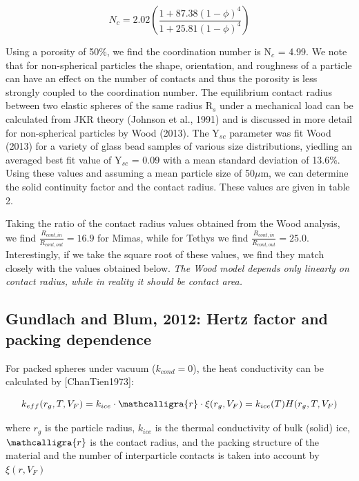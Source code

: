 \documentclass[11pt]{article} %
\newcommand{\vf}{\ensuremath{V_{F}}\xspace}
\newcommand{\sr}{\ensuremath{\mathcalligra{r}} \xspace}
\begin{document}
\begin{itemize}
	\begin{equation}
	N_{c} = 2.02 \left( \frac{1+87.38(1-\phi)^{4}}{1+25.81(1-\phi)^{4}} \right)
	\end{equation}
	
	Using a porosity of 50\%, we find the coordination number is N$_{c}$ = 4.99. We note that for non-spherical particles the shape, orientation, and roughness of a particle can have an effect on the number of contacts and thus the porosity is less strongly coupled to the coordination number. The equilibrium contact radius between two elastic spheres of the same radius R$_{s}$ under a mechanical load can be calculated from JKR theory (Johnson et al., 1991) and is discussed in more detail for non-spherical particles by Wood (2013). The Y$_{sc}$ parameter was fit Wood (2013) for a variety of glass bead samples of various size distributions, yiedling an averaged best fit value of Y$_{sc}$ = 0.09 with a mean standard deviation of 13.6\%. Using these values and assuming a mean particle size of 50$\mu$m, we can determine the solid continuity factor and the contact radius. These values are given in table 2. 

	Taking the ratio of the contact radius values obtained from the Wood analysis, we find $\frac{R_{cont,in}}{R_{cont,out}} = 16.9$ for Mimas, while for Tethys we find $\frac{R_{cont,in}}{R_{cont,out}} = 25.0$. Interestingly, if we take the square root of these values, we find they match closely with the values obtained below. \emph{The Wood model depends only linearly on contact radius, while in reality it should be contact area.}
	
\subsection{Gundlach and Blum, 2012: Hertz factor and packing dependence}

	For packed spheres under vacuum ($k_{cond} = 0$), the heat conductivity can be calculated by [ChanTien1973]:
	
	\begin{equation}
	k_{eff}(r_{g}, T, \vf) = k_{ice}\cdot \sr \cdot \xi(r_{g}, \vf)= k_{ice}(T) H(r_{g},T, \vf)
	\end{equation}

	 where $r_{g}$ is the particle radius, $k_{ice}$ is the thermal conductivity of bulk (solid) ice, \sr is the contact radius, and the packing structure of the material and the number of interparticle contacts is taken into account by $\xi(r, \vf)$ 


\end{itemize}
\end{document}
